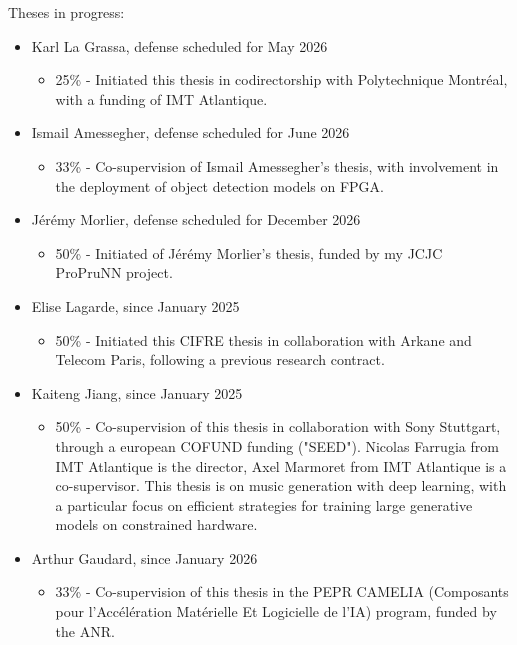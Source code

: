 \documentclass[11pt]{report}
\begin{document}
Theses in progress:

\begin{itemize}
  \item Karl La Grassa, defense scheduled for May 2026
        \begin{itemize}
          \item 25\% - Initiated this thesis in codirectorship with Polytechnique Montréal, with a funding of IMT Atlantique.
        \end{itemize}
  \item Ismail Amessegher, defense scheduled for June 2026
        \begin{itemize}
          \item 33\% - Co-supervision of Ismail Amessegher's thesis, with involvement in the deployment of object detection models on FPGA.
        \end{itemize}
  \item Jérémy Morlier, defense scheduled for December 2026
        \begin{itemize}
          \item 50\% - Initiated of Jérémy Morlier's thesis, funded by my JCJC ProPruNN project.
        \end{itemize}
  \item Elise Lagarde, since January 2025
        \begin{itemize}
          \item 50\% - Initiated this CIFRE thesis in collaboration with Arkane and Telecom Paris, following a previous research contract.
        \end{itemize}
  \item Kaiteng Jiang, since January 2025
        \begin{itemize}
          \item 50\% - Co-supervision of this thesis in collaboration with Sony Stuttgart, through a european COFUND funding ("SEED"). Nicolas Farrugia from IMT Atlantique is the director, Axel Marmoret from IMT Atlantique is a co-supervisor. This thesis is on music generation with deep learning, with a particular focus on efficient strategies for training large generative models on constrained hardware.
        \end{itemize}
  \item Arthur Gaudard, since January 2026
        \begin{itemize}
          \item 33\% - Co-supervision of this thesis in the PEPR CAMELIA (Composants pour l’Accélération Matérielle Et Logicielle de l’IA) program, funded by the ANR.
        \end{itemize}
\end{itemize}
\end{document}
